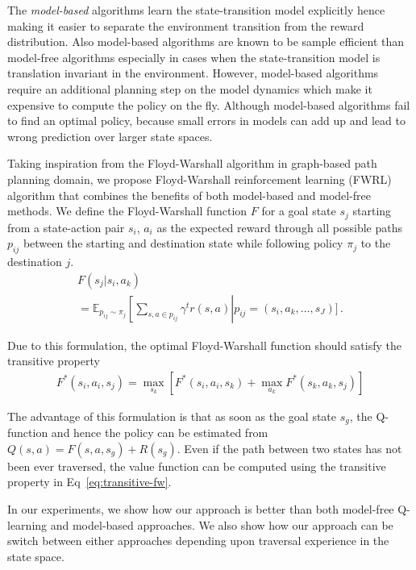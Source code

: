 \documentclass[letterpaper]{article} %
\def\state{s}
\def\act{a}
\def\Rew{R}
\def\E{\mathbb{E}}
\newcommand{\fwcost}{F}
\newcommand{\discount}{\gamma}
\begin{document}
The \emph{model-based} algorithms learn the state-transition model explicitly hence making it
easier to separate the environment transition from the reward distribution. Also model-based
algorithms are known to be sample efficient than model-free algorithms especially in cases when
the state-transition model is translation invariant in the environment. 
However, model-based algorithms require an additional planning step on the model dynamics
which make it expensive to compute the policy on the fly.
Although model-based algorithms fail to find an optimal policy, because small errors in models can add up and lead to wrong prediction over larger state spaces. 

Taking inspiration from the Floyd-Warshall algorithm in graph-based path planning domain,
we propose Floyd-Warshall reinforcement learning (FWRL) algorithm that combines the
benefits of both model-based and model-free methods.
We define the Floyd-Warshall function $\fwcost$ for a goal state $\state_j$ starting from a
state-action pair $\state_i$, $\act_i$
as the expected reward through all possible paths $p_{ij}$ between the starting and
destination state while following policy $\pi_{j}$ to the destination $j$.
%
\begin{multline}
\fwcost(\state_j | \state_i, \act_k) \\
= \E_{p_{ij} \sim \pi_{j}}\left[
\sum_{\state, \act \in p_{ij} } \discount^{t} r(\state, \act) \right| p_{ij} = (\state_i, \act_k, \dots, \state_J) \Biggr] \, .
\end{multline}
%

Due to this formulation, the optimal Floyd-Warshall function should satisfy the transitive property
\begin{align}
\fwcost^*(\state_i, \act_i, \state_j) = \max_{\state_k} \left[
\fwcost^*(\state_i, \act_i, \state_k)
+ \max_{\act_k}\fwcost^*(\state_k, \act_k, \state_j) \right]
\label{eq:transitive-fw}
\end{align}

The advantage of this formulation is that as soon as the goal state $\state_g$, the Q-function and
hence the policy can be estimated from $Q(\state, \act) = F(\state, \act, \state_g) + \Rew(\state_g)$.
Even if the path between two states has not been ever traversed, the value function
can be computed using the transitive property in Eq~\ref{eq:transitive-fw}. 

In our experiments, we show how our approach is better than both model-free Q-learning and model-based approaches. We also show how our approach can be switch between either approaches depending upon traversal experience in the state space.
\end{document}
